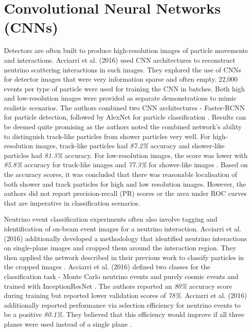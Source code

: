 \section{Convolutional Neural Networks (CNNs)}
Detectors are often built to produce high-resolution images of particle movements and interactions. Acciarri et al. (2016) used CNN architectures to reconstruct neutrino scattering interactions in such images. They explored the use of CNNs for detector images that were very information sparse and often empty. 22,000 events per type of particle were used for training the CNN in batches. Both high and low-resolution images were provided as separate demonstrations to mimic realistic scenarios. The authors combined two CNN architectures - Faster-RCNN for particle detection, followed by AlexNet for particle classification \cite{acciarri2016long}. Results can be deemed quite promising as the authors noted the combined network's ability to distinguish track-like particles from shower particles very well. For high-resolution images, track-like particles had \textit{87.2\%} accuracy and shower-like particles had \textit{81.3\%} accuracy. For low-resolution images, the score was lower with \textit{85.8\%} accuracy for track-like images and \textit{77.3\%} for shower-like images \cite{acciarri2016long}. Based on the accuracy scores, it was concluded that there was reasonable localisation of both shower and track particles for high and low resolution images. However, the authors did not report precision-recall (PR) scores or the area under ROC curves that are imperative in classification scenarios. 
 
Neutrino event classification experiments often also involve tagging and identification of on-beam event images for a neutrino interaction.  Acciarri et al. (2016) additionally developed a methodology that identified neutrino interactions on single-plane images and cropped them around the interaction region. They then applied the network described in their previous work to classify particles in the cropped images \cite{acciarri2017convolutional}. Acciarri et al. (2016) defined two classes for the classification task - Monte Carlo neutrino events and purely cosmic events and trained with InceptionResNet \cite{acciarri2017convolutional}. The authors reported an \textit{80\%} accuracy score during training but reported lower validation scores of \textit{78\%}. Acciarri et al. (2016) additionally reported performance via selection efficiency for neutrino events to be a positive \textit{80.1\%}. They believed that this efficiency would improve if all three planes were used instead of a single plane \cite{acciarri2017convolutional}. 
 
